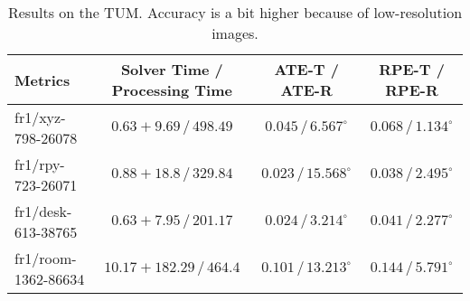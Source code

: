 \begin{table}[t]
    \centering
    \caption{\textnormal{Results on the TUM. Accuracy is a bit higher because of low-resolution images.}}
    \label{tab:tum}
    \begin{adjustbox}{width=\linewidth}
        \begin{tabular}{l|c|c|c|}
            \toprule
            Metrics & Solver Time / Processing Time & ATE-T / ATE-R & RPE-T / RPE-R \\
            \midrule\midrule
             fr1/xyz-798-26078 & $0.63 + 9.69 \, / \, 498.49$ & $0.045 \, / \, 6.567^{\circ}$ & $0.068 \, / \, 1.134^{\circ}$ \\
            \midrule
             fr1/rpy-723-26071 & $0.88 + 18.8 \, / \, 329.84$ & $0.023 \, / \, 15.568^{\circ}$ & $0.038 \, / \, 2.495^{\circ}$ \\
            \midrule
             fr1/desk-613-38765 & $0.63 + 7.95 \, / \, 201.17$ & $0.024 \, / \, 3.214^{\circ}$ & $0.041 \, / \, 2.277^{\circ}$ \\
            \midrule
             fr1/room-1362-86634 & $10.17 + 182.29 \, / \, 464.4$ & $0.101 \, / \, 13.213^{\circ}$ & $0.144 \, / \, 5.791^{\circ}$ \\
            \bottomrule
        \end{tabular}
    \end{adjustbox}
\end{table}


